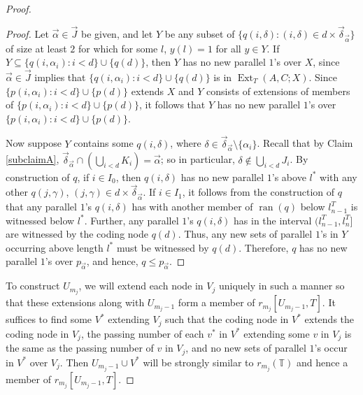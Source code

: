 \documentclass{amsart}
\theoremstyle{remark}
\theoremstyle{definition}
\theoremstyle{remark}
\newcommand{\al}{\alpha}
\newcommand{\sse}{\subseteq}
\DeclareMathOperator{\ran}{ran}
\DeclareMathOperator{\Ext}{Ext}
\newcommand{\bT}{\mathbb{T}}
\begin{document}
\begin{proof}
\begin{proof}
Let $\vec\al\in\vec{J}$ be given,
 and let $Y$ be any subset of $\{q(i,\delta):(i,\delta)\in d\times \vec{\delta}_{\vec\al}\}$  of size at least $2$ for which for some $l$, $y(l)=1$ for all $y\in Y$.
If $Y\sse  \{q(i,\al_i):i<d\}\cup\{q(d)\}$,
then $Y$ has no new parallel $1$'s over $X$, since
$\vec\al\in \vec{J}$ implies that  $\{q(i,\al_i):i<d\}\cup\{q(d)\}$ is in $\Ext_T(A,C;X)$.
Since $\{p(i,\al_i):i<d\}\cup\{p(d)\}$ extends $X$ and
 $Y$ consists of extensions of members of $\{p(i,\al_i):i<d\}\cup\{p(d)\}$,
it follows that
$Y$ has no new parallel $1$'s over $\{p(i,\al_i):i<d\}\cup\{p(d)\}$.



Now suppose $Y$ contains some $q(i,\delta)$, where $\delta\in \vec{\delta}_{\vec\al}\setminus \{\al_i\}$.
Recall that by Claim \ref{subclaimA},
$\vec{\delta}_{\vec\al}\cap (\bigcup_{i<d}K_i)=\vec\al$;
so in particular,  $\delta\not\in \bigcup_{i<d}J_i$.
By construction of $q$,
if  $i\in I_0$, then
$q(i,\delta)$ has no new parallel $1$'s above $l^*$ with any other $q(j,\gamma)$,
$(j,\gamma)\in d\times
 \vec{\delta}_{\vec\al}$.
If $i\in I_1$,
it follows from the construction of $q$ that
 any parallel $1$'s $q(i,\delta)$ has with another member of $\ran(q)$ below $l_{n-1}^T$
is witnessed below $l^*$.
Further, any parallel $1$'s $q(i,\delta)$ has in the interval $(l^T_{n-1},l^T_n]$  are witnessed by the coding node $q(d)$.
Thus, any
 new sets of parallel $1$'s in $Y$ occurring above length $l^*$ must be witnessed by $q(d)$.
Therefore, $q$ has no new parallel $1$'s over $p_{\vec\al}$, and hence,
$q\le p_{\vec\al}$.
\end{proof}




To construct $U_{m_j}$,
we will  extend each node in $V_j$ uniquely in such a manner   so that these extensions along with $U_{m_j-1}$ form a member of  $r_{m_j}[U_{m_j-1},T]$.
It suffices to find some $V^*$ extending $V_j$
such that the coding node in $V^*$ extends the coding node in $V_j$,
the passing number of each $v^*$ in $V^*$ extending some $v$ in $V_j$ is the same as the passing number of $v$ in $V_j$,
and
 no new sets of parallel $1$'s occur in $V^*$ over $V_j$.
Then $U_{m_j-1}\cup V^*$ will be  strongly similar to $r_{m_j}(\bT)$ and hence a member of $r_{m_j}[U_{m_j-1},T]$.




\end{proof}
\end{document}
